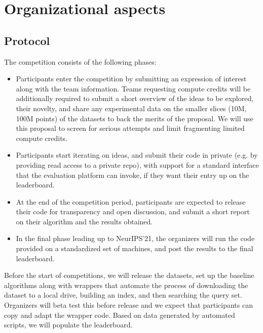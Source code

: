 


\section{Organizational aspects}
\subsection{Protocol}




The competition consists of the following phases:
\begin{itemize}
\item Participants enter the competition by submitting an expression
  of interest along with the team information. Teams requesting
  compute credits will be additionally required to submit a short
  overview of the ideas to be explored, their novelty, and share any
  experimental data on the smaller slices (10M, 100M points) of the
  datasets to back the merits of the proposal. We will use this
  proposal to screen for serious attempts and limit fragmenting
  limited compute credits.
\item Participants start iterating on ideas, and submit their code in private
  (e.g. by providing read access to a private repo), with support for
  a standard interface that the evaluation platform can invoke, if
  they want their entry up on the leaderboard.
\item At the end of the competition period, participants are expected
  to release their code for transparency and open discussion, and
  submit a short report on their algorithm and the results obtained.
\item In the final phase leading up to NeurIPS'21, the organizers will
  run the code provided on a standardized set of machines, and post
  the results to the final leaderboard.
\end{itemize}

Before the start of competitions, we will release the datasets, set up
the baseline algorithms along with wrappers that automate the process
of downloading the dataset to a local drive, building an index, and
then searching the query set. Organizers will beta test this before
release and we expect that participants can copy and adapt the wrapper
code.  Based on data generated by automated scripts, we will populate
the leaderboard.


